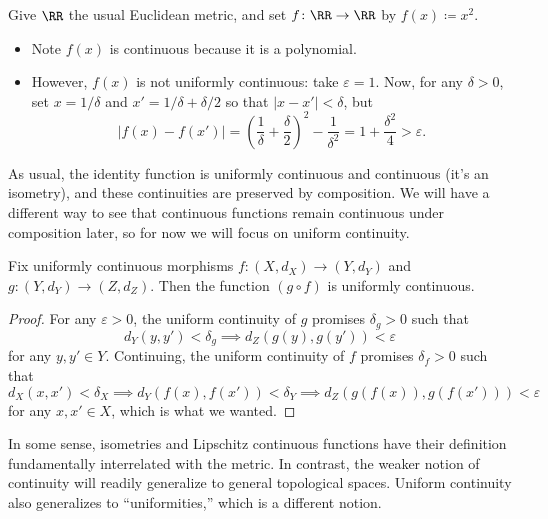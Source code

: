 \documentclass[../notes.tex]{subfiles}
\begin{document}
\begin{example}
	Give $\RR$ the usual Euclidean metric, and set $f\colon\RR\to\RR$ by $f(x)\coloneqq x^2$.
	\begin{itemize}
		\item Note $f(x)$ is continuous because it is a polynomial.
		\item However, $f(x)$ is not uniformly continuous: take $\varepsilon=1$. Now, for any $\delta>0$, set $x=1/\delta$ and $x'=1/\delta+\delta/2$ so that $|x-x'|<\delta$, but
		\[|f(x)-f(x')|=\left(\frac1\delta+\frac\delta2\right)^2-\frac1{\delta^2}=1+\frac{\delta^2}4>\varepsilon.\]
	\end{itemize}
\end{example}
As usual, the identity function is uniformly continuous and continuous (it's an isometry), and these continuities are preserved by composition. We will have a different way to see that continuous functions remain continuous under composition later, so for now we will focus on uniform continuity.
\begin{lemma}
	Fix uniformly continuous morphisms $f\colon(X,d_X)\to(Y,d_Y)$ and $g\colon(Y,d_Y)\to(Z,d_Z)$. Then the function $(g\circ f)$ is uniformly continuous.
\end{lemma}
\begin{proof}
	For any $\varepsilon>0$, the uniform continuity of $g$ promises $\delta_g>0$ such that
	\[d_Y(y,y')<\delta_g\implies d_Z(g(y),g(y'))<\varepsilon\]
	for any $y,y'\in Y$. Continuing, the uniform continuity of $f$ promises $\delta_f>0$ such that
	\[d_X(x,x')<\delta_X\implies d_Y(f(x),f(x'))<\delta_Y\implies d_Z(g(f(x)),g(f(x')))<\varepsilon\]
	for any $x,x'\in X$, which is what we wanted.
\end{proof}
\begin{remark}
	In some sense, isometries and Lipschitz continuous functions have their definition fundamentally interrelated with the metric. In contrast, the weaker notion of continuity will readily generalize to general topological spaces. Uniform continuity also generalizes to ``uniformities,'' which is a different notion.
\end{remark}
\end{document}
